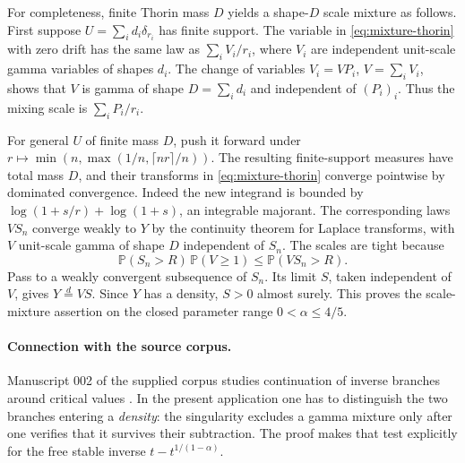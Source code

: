 \documentclass[11pt,a4paper]{article}
\numberwithin{equation}{section}
\begin{document}
For completeness, finite Thorin mass $D$ yields a shape-$D$ scale
mixture as follows. First suppose $U=\sum_i d_i\delta_{r_i}$ has
finite support. The variable in \eqref{eq:mixture-thorin} with zero
drift has the same law as $\sum_i V_i/r_i$, where $V_i$ are independent
unit-scale gamma variables of shapes $d_i$. The change of variables
$V_i=V P_i$, $V=\sum_i V_i$, shows that $V$ is gamma of shape
$D=\sum_i d_i$ and independent of $(P_i)_i$. Thus the mixing scale
is $\sum_i P_i/r_i$.

For general $U$ of finite mass $D$, push it forward under
$r\mapsto\min(n,\max(1/n,\lceil nr\rceil/n))$. The resulting
finite-support measures have total mass $D$, and their transforms
in \eqref{eq:mixture-thorin} converge pointwise by dominated
convergence. Indeed the new integrand is bounded by
$\log(1+s/r)+\log(1+s)$, an integrable majorant. The corresponding
laws $V S_n$ converge weakly to $Y$ by the continuity theorem for
Laplace transforms, with $V$ unit-scale gamma of shape $D$ independent
of $S_n$. The scales are tight because
\[
 \mathbb P(S_n>R)\,\mathbb P(V\ge1)\le\mathbb P(VS_n>R).
\]
Pass to a weakly convergent subsequence of $S_n$. Its limit $S$,
taken independent of $V$, gives $Y\stackrel{d}{=}VS$. Since $Y$
has a density, $S>0$ almost surely. This proves the scale-mixture
assertion on the closed parameter range $0<\alpha\le4/5$.

\paragraph{Connection with the source corpus.}
Manuscript 002 of the supplied corpus studies continuation of inverse
branches around critical values \cite{corpus}. In the present
application one has to distinguish the two branches entering a
\emph{density}: the singularity excludes a gamma mixture only after
one verifies that it survives their subtraction. The proof makes that
test explicitly for the free stable inverse $t-t^{1/(1-\alpha)}$.
\appendix
\end{document}
